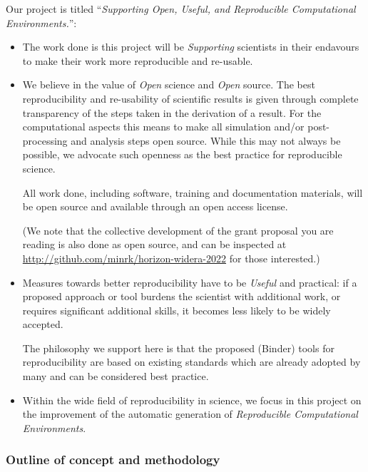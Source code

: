 Our project is titled ``\emph{Supporting Open, Useful, and Reproducible Computational Environments.}'':
\begin{itemize}
\item The work done is this project will be \emph{Supporting} scientists in their
  endavours to make their work more reproducible and re-usable.
\item We believe in the value of \emph{Open} science and \emph{Open} source. The
  best reproducibility and re-usability of scientific results is given through
  complete transparency of the steps taken in the derivation of a result. For
  the computational aspects this means to make all simulation and/or
  post-processing and analysis steps open source. While this may not always be
  possible, we advocate such openness as the best practice for reproducible science.

  All work done, including software, training and documentation materials, will
  be open source and available through an open access license.

  (We note that the collective development of the grant proposal you are reading
  is also done as open source, and can be inspected at
  \url{http://github.com/minrk/horizon-widera-2022} for those interested.)

\item Measures towards better reproducibility have to be \emph{Useful} and
  practical: if a proposed approach or tool burdens the scientist with
  additional work, or requires significant additional skills, it becomes less
  likely to be widely accepted.

  The philosophy we support here is that the proposed (Binder) tools for
  reproducibility are based on existing standards which are already
  adopted by many and can be considered best practice.

\item Within the wide field of reproducibility in science, we focus in this
  project on the improvement of the automatic generation of \emph{Reproducible
    Computational Environments}.
\end{itemize}

\subsubsection{Outline of concept and methodology}

